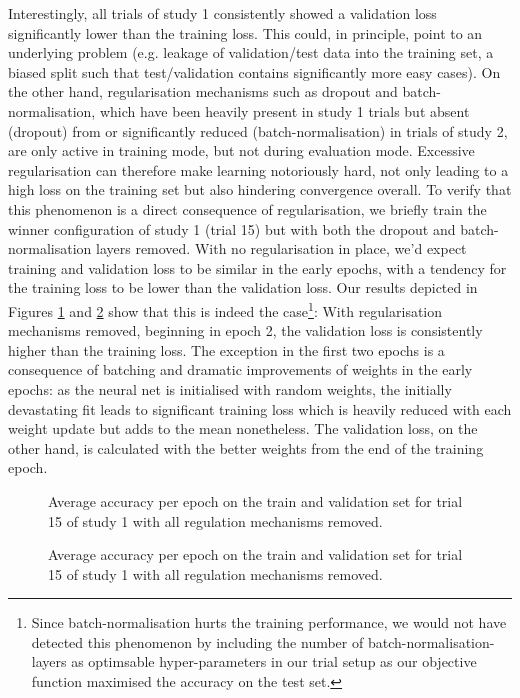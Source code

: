 \documentclass[british,12p]{article}
\begin{document}
   	  	Interestingly, all trials of study 1 consistently showed a validation loss significantly lower than the training loss. This could, in principle, point to an underlying problem (e.g. leakage of validation/test data into the training set, a biased split such that test/validation contains significantly more easy cases). On the other hand, regularisation mechanisms such as dropout and batch-normalisation, which have been heavily present in study 1 trials but absent (dropout) from or significantly reduced (batch-normalisation) in trials of study 2, are only active in training mode, but not during evaluation mode. Excessive regularisation can therefore make learning notoriously hard, not only leading to a high loss on the training set but also hindering convergence overall. To verify that this phenomenon is a direct consequence of regularisation, we briefly train the winner configuration of study 1 (trial 15) but with both the dropout and batch-normalisation layers removed. With no regularisation in place, we'd expect training and validation loss to be similar in the early epochs, with a tendency for the training loss to be lower than the validation loss. Our results depicted in Figures \ref{fig-trial-1-15-loss-noreg} and \ref{fig-trial-1-15-acc-noreg} show that this is indeed the case\footnote{Since batch-normalisation hurts the training performance, we would not have detected this phenomenon by including the number of batch-normalisation-layers as optimsable hyper-parameters in our trial setup as our objective function maximised the accuracy on the test set.}: With regularisation mechanisms removed, beginning in epoch 2, the validation loss is consistently higher than the training loss. The exception in the first two epochs is a consequence of batching and dramatic improvements of weights in the early epochs: as the neural net is initialised with random weights, the initially devastating fit leads to significant training loss which is heavily reduced with each weight update but adds to the mean nonetheless. The validation loss, on the other hand, is calculated with the better weights from the end of the training epoch.   	  	
   	  	
    \begin{figure}[hbt]
		\begin{center}
  			\caption{Average accuracy per epoch on the train and validation set for trial 15 of study 1 with all regulation mechanisms removed.}
  			\label{fig-trial-1-15-loss-noreg}
  		\end{center}
	\end{figure}
   	\begin{figure}[hbt]
		\begin{center}
  			\caption{Average accuracy per epoch on the train and validation set for trial 15 of study 1 with all regulation mechanisms removed.}
  			\label{fig-trial-1-15-acc-noreg}
  		\end{center}
	\end{figure}
\end{document}
